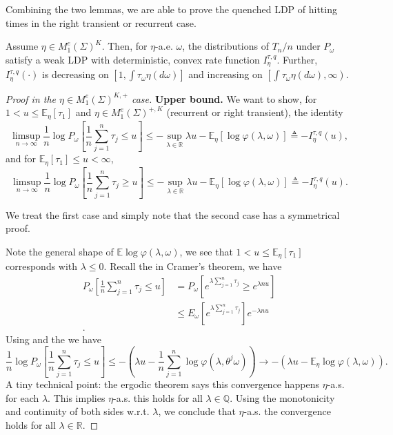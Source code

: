 Combining the two lemmas, we are able to prove the quenched LDP of hitting times in the right transient or recurrent case.

\begin{thm}[Theorem 4]
	\label{thm:Comet00Thm4}
Assume $\eta \in M_1^e(\Sigma)^K$. Then, for $\eta$-a.e. $\omega$, the distributions of $T_n / n$ under $P_\omega$ satisfy a weak LDP with deterministic, convex rate function $I_\eta^{\tau, q}$. Further, $I_\eta^{\tau, q}(\cdot)$ is decreasing on $\left[1, \int \tau_\omega \eta(d \omega)\right]$ and increasing on $\left[\int \tau_\omega \eta(d \omega), \infty\right)$.	
\end{thm}
\begin{proof}[Proof in the $\eta \in M_1^e(\Sigma)^{K, +}$ case]

	\textbf{Upper bound.} We want to show, for $1 < u \le \mathbb{E}_ \eta [\tau_1]$ and $\eta \in M_1^e (\Sigma)^{+, K}$ (recurrent or right transient), the identity
	\[
		\limsup_{n \to \infty} \frac{1}{n} \log P_\omega \left[ \frac{1}{n} \sum_{j=1}^{n} \tau_j \le u \right] \le - \sup _{\lambda \in \mathbb{R}} \lambda u - \mathbb{E}_ \eta \left[ \log \varphi (\lambda, \omega) \right] \triangleq - I_\eta ^{\tau, q}(u)
	,\]
	and for $\mathbb{E}_ \eta [\tau_1] \le  u < \infty $,
	\[
		\limsup_{n \to \infty} \frac{1}{n} \log P_\omega \left[ \frac{1}{n} \sum_{j=1}^{n} \tau_j \ge u \right] \le - \sup _{\lambda \in \mathbb{R}} \lambda u - \mathbb{E}_ \eta \left[ \log \varphi (\lambda, \omega) \right] \triangleq - I_\eta ^{\tau, q}(u)
	.\]
	
	We treat the first case and simply note that the second case has a symmetrical proof. 

	Note the general shape of $\mathbb{E}\log \varphi(\lambda, \omega)$, we see that $1 < u \le \mathbb{E}_ \eta [\tau_1]$ corresponds with $\lambda \le 0$. Recall the  in Cramer's theorem, we have
	\begin{align*}
		P_\omega \left[ \frac{1}{n} \sum_{j=1}^{n} \tau_j \le u \right]
		&= P_\omega \left[ e^{\lambda\sum_{j=1}^{n} \tau_j } \ge e^{\lambda n u} \right] \\
		&\leq E_\omega \left[ e^{\lambda\sum_{j=1}^{n} \tau_j } \right] e^{- \lambda n u} \\
	.\end{align*}
	Using  and the  we have
	\[
		\frac{1}{n} \log  P_\omega \left[ \frac{1}{n} \sum_{j=1}^{n} \tau_j \le u \right]
		\le - \left(\lambda u - \frac{1}{n} \sum_{j=1}^{n}\log \varphi(\lambda, \theta^j \omega)\right) 
		\to - \left( \lambda u - \mathbb{E}_ \eta \log \varphi(\lambda, \omega) \right) 
	.\] 
	A tiny technical point: the ergodic theorem says this convergence happens $\eta$-a.s. for each $\lambda$. This implies $\eta$-a.s. this holds for all $\lambda \in \mathbb{Q}$. Using the monotonicity and continuity of both sides w.r.t. $\lambda$, we conclude that $\eta$-a.s. the convergence holds for all $\lambda \in \mathbb{R}$. 


\end{proof}
